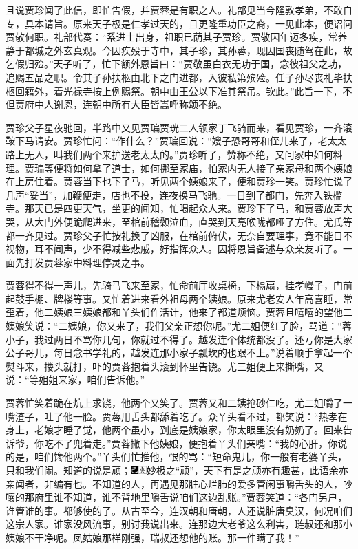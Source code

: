 且说贾珍闻了此信，即忙告假，并贾蓉是有职之人。礼部见当今隆敦孝弟，不敢自专，具本请旨。原来天子极是仁孝过天的，且更隆重功臣之裔，一见此本，便诏问贾敬何职。礼部代奏：“系进士出身，祖职已荫其子贾珍。贾敬因年迈多疾，常养静于都城之外玄真观。今因疾殁于寺中，其子珍，其孙蓉，现因国丧随驾在此，故乞假归殓。”天子听了，忙下额外恩旨曰：“贾敬虽白衣无功于国，念彼祖父之功，追赐五品之职。令其子孙扶柩由北下之门进都，入彼私第殡殓。任子孙尽丧礼毕扶柩回籍外，着光禄寺按上例赐祭。朝中由王公以下准其祭吊。钦此。”此旨一下，不但贾府中人谢恩，连朝中所有大臣皆嵩呼称颂不绝。

贾珍父子星夜驰回，半路中又见贾㻞贾珖二人领家丁飞骑而来，看见贾珍，一齐滚鞍下马请安。贾珍忙问：“作什么？”贾㻞回说：“嫂子恐哥哥和侄儿来了，老太太路上无人，叫我们两个来护送老太太的。”贾珍听了，赞称不绝，又问家中如何料理。贾㻞等便将如何拿了道士，如何挪至家庙，怕家内无人接了亲家母和两个姨娘在上房住着。贾蓉当下也下了马，听见两个姨娘来了，便和贾珍一笑。贾珍忙说了几声“妥当”，加鞭便走，店也不投，连夜换马飞驰。一日到了都门，先奔入铁槛寺。那天已是四更天气，坐更的闻知，忙喝起众人来。贾珍下了马，和贾蓉放声大哭，从大门外便跪爬进来，至棺前稽颡泣血，直哭到天亮喉咙都哑了方住。尤氏等都一齐见过。贾珍父子忙按礼换了凶服，在棺前俯伏，无奈自要理事，竟不能目不视物，耳不闻声，少不得减些悲戚，好指挥众人。因将恩旨备述与众亲友听了。一面先打发贾蓉家中料理停灵之事。

贾蓉得不得一声儿，先骑马飞来至家，忙命前厅收桌椅，下槅扇，挂孝幔子，门前起鼓手棚、牌楼等事。又忙着进来看外祖母两个姨娘。原来尤老安人年高喜睡，常歪着，他二姨娘三姨娘都和丫头们作活计，他来了都道烦恼。贾蓉且嘻嘻的望他二姨娘笑说：“二姨娘，你又来了，我们父亲正想你呢。”尤二姐便红了脸，骂道：“蓉小子，我过两日不骂你几句，你就过不得了。越发连个体统都没了。还亏你是大家公子哥儿，每日念书学礼的，越发连那小家子瓢坎的也跟不上。”说着顺手拿起一个熨斗来，搂头就打，吓的贾蓉抱着头滚到怀里告饶。尤三姐便上来撕嘴，又说：“等姐姐来家，咱们告诉他。”

贾蓉忙笑着跪在炕上求饶，他两个又笑了。贾蓉又和二姨抢砂仁吃，尤二姐嚼了一嘴渣子，吐了他一脸。贾蓉用舌头都舔着吃了。众丫头看不过，都笑说：“热孝在身上，老娘才睡了觉，他两个虽小，到底是姨娘家，你太眼里没有奶奶了。回来告诉爷，你吃不了兜着走。”贾蓉撇下他姨娘，便抱着丫头们亲嘴：“我的心肝，你说的是，咱们馋他两个。”丫头们忙推他，恨的骂：“短命鬼儿，你一般有老婆丫头，只和我们闹。知道的说是顽；{\includegraphics[width=3mm]{../Images/00003}\includegraphics[width=3mm]{../Images/00012}\footnotesize \kaishu 妙极之“顽”，天下有是之顽亦有趣甚，此语余亦亲闻者，非编有也。}不知道的人，再遇见那脏心烂肺的爱多管闲事嚼舌头的人，吵嚷的那府里谁不知道，谁不背地里嚼舌说咱们这边乱账。”贾蓉笑道：“各门另户，谁管谁的事。都够使的了。从古至今，连汉朝和唐朝，人还说脏唐臭汉，何况咱们这宗人家。谁家没风流事，别讨我说出来。连那边大老爷这么利害，琏叔还和那小姨娘不干净呢。凤姑娘那样刚强，瑞叔还想他的账。那一件瞒了我！”

